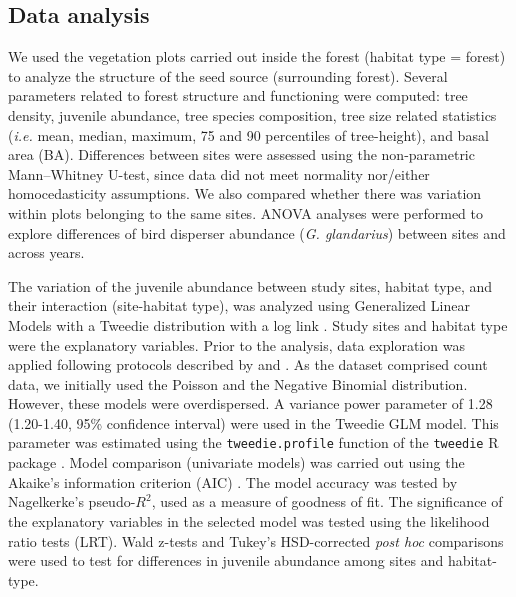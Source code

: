 \subsection{Data analysis}\label{sec:coloniza:analysis}
We used the vegetation plots carried out inside the forest (habitat type = forest) to analyze the structure of the seed source (surrounding forest). Several parameters related to forest structure and functioning were computed: tree density, juvenile abundance, tree species composition, tree size related statistics (\emph{i.e.} mean, median, maximum, 75 and 90 percentiles of tree-height), and basal area (BA). Differences between sites were assessed using the non-parametric Mann–Whitney U-test, since data did not meet normality nor/either homocedasticity assumptions. We also compared whether there was variation within plots belonging to the same sites. ANOVA analyses were performed to explore differences of bird disperser abundance (\emph{G. glandarius}) between sites and across years. 

The variation of the juvenile abundance between study sites, habitat type, and their interaction (site-habitat type), was analyzed using Generalized Linear Models with a Tweedie distribution with a log link \autocite{DunnSmyth2018TweedieGLMs}. Study sites and habitat type were the explanatory variables. Prior to the analysis, data exploration was applied following protocols described by \citet{Zuuretal2010ProtocolData} and \citet{IenoZuur2015BeginnerGuide}. As the dataset comprised count data, we initially used the Poisson and the Negative Binomial distribution. However, these models were overdispersed. A variance power parameter of 1.28 (1.20-1.40, 95\% confidence interval) were used in the Tweedie GLM model. This parameter was estimated using the \texttt{tweedie.profile} function of the \texttt{tweedie} R package \autocites{DunnSmyth2005SeriesEvaluation,Dunn2017Tweedie}. Model comparison (univariate models) was carried out using the Akaike's information criterion (AIC) \autocites{BurnhamAnderson2010ModelSelection}. The model accuracy was tested by Nagelkerke's pseudo-$R^2$, used as a measure of goodness of fit. The significance of the explanatory variables in the selected model was tested using the likelihood ratio tests (LRT). Wald z-tests and Tukey's HSD-corrected \emph{post hoc} comparisons were used to test for differences in juvenile abundance among sites and habitat-type. 

